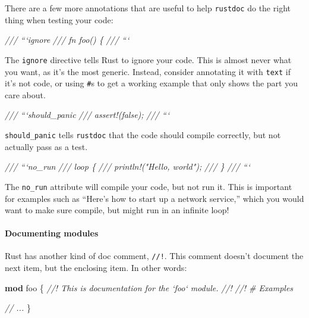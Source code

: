 \documentclass[a4paper,]{book}
\newenvironment{Shaded}{\begin{snugshade}}{\end{snugshade}}
\newcommand{\KeywordTok}[1]{\textcolor[rgb]{0.13,0.29,0.53}{\textbf{{#1}}}}
\newcommand{\CommentTok}[1]{\textcolor[rgb]{0.56,0.35,0.01}{\textit{{#1}}}}
\newcommand{\NormalTok}[1]{{#1}}
\begin{document}
There are a few more annotations that are useful to help
\texttt{rustdoc} do the right thing when testing your code:

\begin{Shaded}
\begin{Highlighting}[]
\CommentTok{/// ```ignore}
\CommentTok{/// fn foo() \{}
\CommentTok{/// ```}
\end{Highlighting}
\end{Shaded}

The \texttt{ignore} directive tells Rust to ignore your code. This is
almost never what you want, as it's the most generic. Instead, consider
annotating it with \texttt{text} if it's not code, or using \texttt{\#}s
to get a working example that only shows the part you care about.

\begin{Shaded}
\begin{Highlighting}[]
\CommentTok{/// ```should_panic}
\CommentTok{/// assert!(false);}
\CommentTok{/// ```}
\end{Highlighting}
\end{Shaded}

\texttt{should\_panic} tells \texttt{rustdoc} that the code should
compile correctly, but not actually pass as a test.

\begin{Shaded}
\begin{Highlighting}[]
\CommentTok{/// ```no_run}
\CommentTok{/// loop \{}
\CommentTok{///     println!("Hello, world");}
\CommentTok{/// \}}
\CommentTok{/// ```}
\end{Highlighting}
\end{Shaded}

The \texttt{no\_run} attribute will compile your code, but not run it.
This is important for examples such as ``Here's how to start up a
network service,'' which you would want to make sure compile, but might
run in an infinite loop!

\paragraph{Documenting modules}\label{documenting-modules}

Rust has another kind of doc comment, \texttt{//!}. This comment doesn't
document the next item, but the enclosing item. In other words:

\begin{Shaded}
\begin{Highlighting}[]
\KeywordTok{mod} \NormalTok{foo \{}
    \CommentTok{//! This is documentation for the `foo` module.}
    \CommentTok{//!}
    \CommentTok{//! # Examples}

    \CommentTok{// ...}
\NormalTok{\}}
\end{Highlighting}
\end{Shaded}
\end{document}

